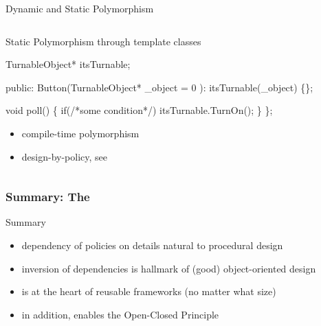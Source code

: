 \documentclass[9pt]{beamer}
\begin{document}
\begin{frame}[fragile]
\begin{block}{Dynamic and Static Polymorphism}
\begin{columns}[t]
\begin{column}{.45\textwidth}
\begin{block}{Static Polymorphism through template classes}
\begin{center}
\begin{semiverbatim}
TurnableObject* itsTurnable;

public:
  Button(TurnableObject* _object = 0 ): 
    itsTurnable(_object)
    \{\};

  void poll() \{
    if(/*some condition*/)
      itsTurnable.TurnOn();
    \}
\};
              \end{semiverbatim}
          \end{center}
        \normalsize
        \begin{itemize}
        \item compile-time polymorphism
        \item design-by-policy, see \cite{alexandrescu}
        \end{itemize}
      \end{block}
    \end{column}

  \end{columns}
  \end{block}
\end{frame}

\begin{frame}
  \frametitle{Summary: The \secname}
\begin{block}{Summary}
  \begin{itemize}
  \item dependency of policies on details natural to procedural design
  \item inversion of dependencies is hallmark of (good) object-oriented design
  \item {\secname} is at the heart of reusable frameworks (no matter what size)
  \item in addition, enables the Open-Closed Principle
  \end{itemize}
\end{block}
\end{frame}
\end{document}
